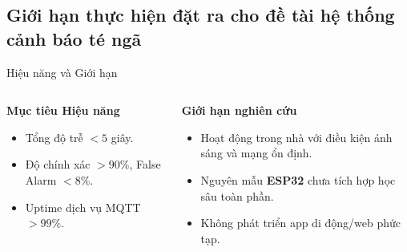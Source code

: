 
\subsection{Giới hạn thực hiện đặt ra cho đề tài hệ thống cảnh báo té ngã} 
\begin{frame}{Hiệu năng và Giới hạn}
    \begin{columns}[T]
        \begin{column}{0.48\textwidth}
            \textbf{Mục tiêu Hiệu năng}
            \begin{itemize}
                \item Tổng độ trễ $<5$ giây.
                \item Độ chính xác $>90\%$, False Alarm $<8\%$.
                \item Uptime dịch vụ MQTT $>99\%$.
            \end{itemize}
        \end{column}
        \begin{column}{0.48\textwidth}
            \textbf{Giới hạn nghiên cứu}
            \begin{itemize}
                \item Hoạt động trong nhà với điều kiện ánh sáng và mạng ổn định.
                \item Nguyên mẫu \textbf{ESP32} chưa tích hợp học sâu toàn phần.
                \item Không phát triển app di động/web phức tạp.
            \end{itemize}
        \end{column}
    \end{columns}
\end{frame}
